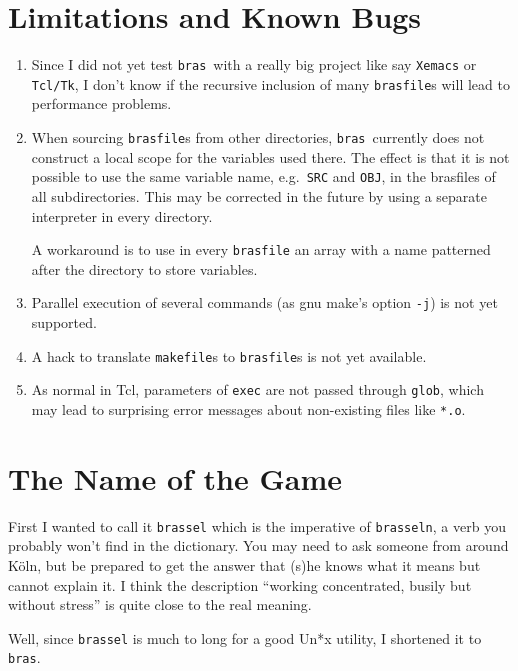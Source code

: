 \documentclass[12pt]{article}
\newcommand{\bras}{\texttt{bras}}
\begin{document}
\section{Limitations and Known Bugs}


\begin{enumerate}
\item
Since I did not yet test \bras\ with a really big project like say
\texttt{Xemacs} or \texttt{Tcl/Tk}, I don't know if the recursive
inclusion of many \texttt{brasfile}s will lead to performance
problems.

\item
When sourcing \texttt{brasfile}s from other directories, \bras\
currently does not construct a local scope for the variables used
there. The effect is that it is not possible to use the same variable
name, e.g.\ \texttt{SRC} and \texttt{OBJ}, in the brasfiles
of all subdirectories. This may be corrected in the future by using a
separate interpreter in every directory.

A workaround is to use in every \texttt{brasfile} an array with a name
patterned after the directory to store variables.

\item 
Parallel execution of several commands (as gnu make's option
\texttt{-j}) is not yet supported.

\item
A hack to translate \texttt{makefile}s to \texttt{brasfile}s is not
yet available.

\item
As normal in Tcl, parameters of \texttt{exec} are not passed through
\texttt{glob}, which may lead to surprising error messages about
non-existing files like \texttt{*.o}.

\end{enumerate}

\section{The Name of the Game}

First I wanted to call it \texttt{brassel} which is the imperative of
\texttt{brasseln}, a verb you probably won't find in the
dictionary. You may need to ask someone from around K\"oln, but be
prepared to get the answer that (s)he knows what it means but cannot
explain it. I think the description "`working concentrated, busily but
without stress"' is quite close to the real meaning.

Well, since \texttt{brassel} is much to long for a good
Un*x utility, I shortened it to \bras.
    
\end{document}
